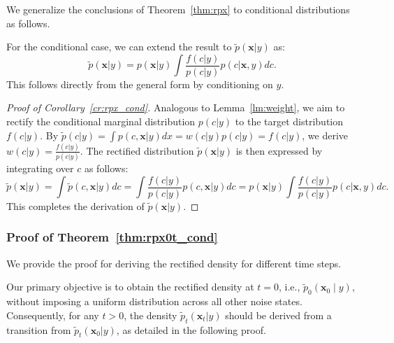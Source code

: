 We generalize the conclusions of Theorem~\ref{thm:rpx} to conditional distributions as follows.

\begin{corollary}\label{cr:rpx_cond}

For the conditional case, we can extend the result to $\tilde{p}(\boldsymbol{x}|y)$ as:
    \begin{equation}
 \tilde{p}(\boldsymbol{x}|y) = p(\boldsymbol{x}|y) \int \frac{f(c|y)}{p(c|y)} p(c | \boldsymbol{x}, y) dc.
    \end{equation}
 This follows directly from the general form by conditioning on $y$.
\end{corollary}

\begin{proof}[Proof of Corollary~\ref{cr:rpx_cond}]
 Analogous to Lemma~\ref{lm:weight}, we aim to rectify the conditional marginal distribution $p(c|y)$ to the target distribution $f(c|y)$. By $\tilde{p}(c|y) = \int p(c,\boldsymbol{x}|y) dx = w(c|y)p(c|y) = f(c|y)$, we derive $w(c|y)=\frac{f(c|y)}{p(c|y)}$. The rectified distribution $\tilde{p}(\boldsymbol{x}|y)$ is then expressed by integrating over $c$ as follows:
    \begin{equation}
 \tilde{p}(\boldsymbol{x}|y) = \int \tilde{p}(c,\boldsymbol{x}|y) dc=\int\frac{f(c|y)}{p(c|y)}p(c, \boldsymbol{x}|y) dc=p(\boldsymbol{x}|y) \int \frac{f(c|y)}{p(c|y)} p(c|\boldsymbol{x},y) dc.
    \end{equation}
 This completes the derivation of $\tilde{p}(\boldsymbol{x}|y)$.
\end{proof}





\subsubsection{Proof of Theorem~\ref{thm:rpx0t_cond}}
We provide the proof for deriving the rectified density for different time steps.
\begin{remark}
 Our primary objective is to obtain the rectified density at $t=0$, i.e., $\tilde{p}_0(\boldsymbol{x}_0 \mid y)$, without imposing a uniform distribution across all other noise states. Consequently, for any $t>0$, the density $\tilde{p}_t(\boldsymbol{x}_t|y)$ should be derived from a transition from $\tilde{p}_t(\boldsymbol{x}_0|y)$, as detailed in the following proof.
\end{remark}


